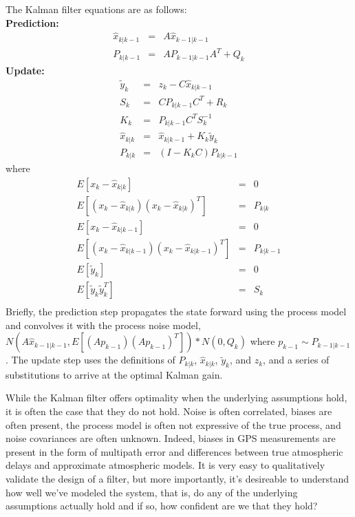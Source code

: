 The Kalman filter equations are as follows:\\
{\bf Prediction:}
\begin{equation}
\begin{aligned}
\hat{x}_{k|k-1} &=& A \hat{x}_{k-1|k-1}\\
P_{k|k-1} &=& A P_{k-1|k-1} A^T + Q_k
\end{aligned}
\end{equation}
{\bf Update:}
\begin{equation}
\begin{aligned}
\tilde{y}_k &=& z_k - C \hat{x}_{k|k-1}\\
S_k &=& C P_{k|k-1} C^T + R_k\\
K_k &=& P_{k|k-1} C^T S_k^{-1}\\
\hat{x}_{k|k} &=& \hat{x}_{k|k-1} + K_k \tilde{y}_k\\
P_{k|k} &=& (I - K_k C) P_{k|k-1}
\end{aligned}
\end{equation}
where
\begin{equation}
\begin{aligned}
E[x_k - \hat{x}_{k|k}] &=& 0\\
E[(x_k - \hat{x}_{k|k})(x_k - \hat{x}_{k|k})^T] &=& P_{k|k}\\
E[x_k - \hat{x}_{k|k-1}] &=& 0\\
E[(x_k - \hat{x}_{k|k-1})(x_k - \hat{x}_{k|k-1})^T] &=& P_{k|k-1}\\
E[\tilde{y}_k] &=& 0\\
E[\tilde{y}_k\tilde{y}_k^T] &=& S_k\\
\end{aligned}
\end{equation}
Briefly, the prediction step propagates the state forward using the process model and convolves it with the process noise model, $N(A\hat{x}_{k-1|k-1}, E[(Ap_{k-1})(Ap_{k-1})^T]) \ast N(0, Q_k)$ where $p_{k-1} \sim P_{k-1|k-1}$.
 The update step uses the definitions of $P_{k|k}$, $\hat{x}_{k|k}$, $\tilde{y}_k$, and $z_k$, and a series of substitutions to arrive at the optimal Kalman gain.

While the Kalman filter offers optimality when the underlying assumptions hold, it is often the case that they do not hold.  Noise is often correlated, biases are often present, the process model is often not expressive of the true process, and noise covariances are often unknown.  Indeed, biases in GPS measurements are present in the form of multipath error and differences between true atmospheric delays and approximate atmospheric models.  It is very easy to qualitatively validate the design of a filter, but more importantly, it's desireable to understand how well we've modeled the system, that is, do any of the underlying assumptions actually hold and if so, how confident are we that they hold?

